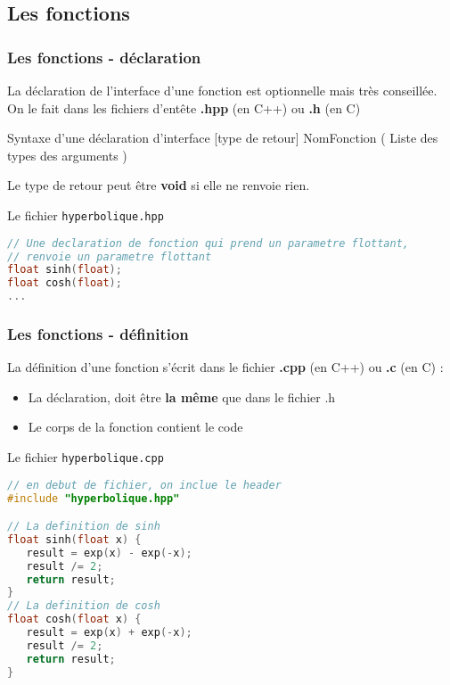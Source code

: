 \documentclass{beamer}
\begin{document}
\subsection{Les fonctions}
\begin{frame}[fragile=singleslide,shrink=20]
\frametitle{Les fonctions - déclaration }

La déclaration de l'interface d'une fonction est optionnelle mais très conseillée. On le fait dans les fichiers d'entête \textbf{.hpp} (en C++) ou \textbf{.h} (en C)


\begin{block}{Syntaxe d'une déclaration d'interface}
[type de retour] NomFonction ( Liste des types des arguments )
\end{block}
Le type de retour peut être \textbf{void} si elle ne renvoie rien.\\ 


\begin{block}{Le fichier \texttt{hyperbolique.hpp}}
\begin{lstlisting}[language=c++]
// Une declaration de fonction qui prend un parametre flottant,
// renvoie un parametre flottant
float sinh(float);
float cosh(float);
...
\end{lstlisting}
\end{block}


\end{frame}



\begin{frame}[fragile=singleslide,shrink=20]
\frametitle{Les fonctions - définition}

La définition d'une fonction s'écrit dans le fichier \textbf{.cpp} (en C++) ou \textbf{.c} (en C) :
\begin{itemize}
\item{La déclaration, doit être \textbf{la même} que dans le fichier .h}
\item{Le corps de la fonction contient le code }
\end{itemize}

\begin{block}{Le fichier \texttt{hyperbolique.cpp}}
\begin{lstlisting}[language=c++]
// en debut de fichier, on inclue le header
#include "hyperbolique.hpp"

// La definition de sinh
float sinh(float x) {
   result = exp(x) - exp(-x);
   result /= 2;
   return result;
}
// La definition de cosh
float cosh(float x) {
   result = exp(x) + exp(-x);
   result /= 2;
   return result;
}

\end{lstlisting}
\end{block}
\end{frame}
\end{document}
